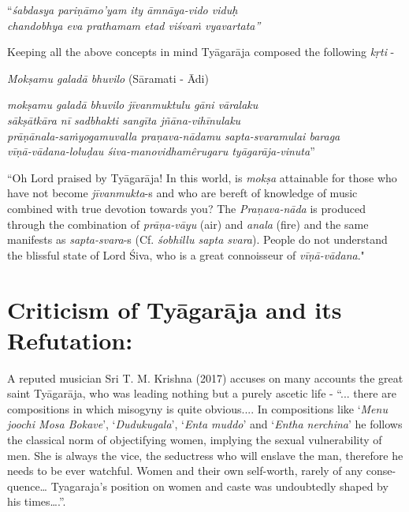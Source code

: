 \begin{longquote}
“\textit{śabdasya pariṇāmo’yam ity āmnāya-vido viduḥ }\\ \textit{chandobhya eva prathamam etad viśvaṁ vyavartata”} 
\end{longquote}

Keeping all the above concepts in mind Tyāgarāja composed the following \textit{kṛti} -

\textit{Mokṣamu galadā bhuvilo} (Sāramati - Ādi)

\begin{longquote}
\textit{mokṣamu galadā bhuvilo jīvanmuktulu gāni vāralaku}\\ \textit{sākṣātkāra nī sadbhakti sangīta jñāna-vihīnulaku}\\ \textit{prāṇānala-saṁyogamuvalla praṇava-nādamu sapta-svaramulai baraga}\\ \textit{vīṇā-vādana-loluḍau śiva-manovidhamêrugaru tyāgarāja-vinuta}”
\end{longquote}

``Oh Lord praised by Tyāgarāja! In this world, is \textit{mokṣa} attainable for those who have not become \textit{jīvanmukta}-s and who are bereft of knowledge of music combined with true devotion towards you? The \textit{Praṇava-nāda} is produced through the combination of \textit{prāṇa-vāyu} (air) and \textit{anala} (fire) and the same manifests as \textit{sapta-svara}-s (Cf. \textit{śobhillu sapta svara}). People do not understand the blissful state of Lord Śiva, who is a great connoisseur of \textit{vīṇā-vādana}."

\vspace{-.3cm}

\section*{Criticism of Tyāgarāja and its Refutation:}

\vspace{-.2cm}

A reputed musician Sri T. M. Krishna (2017) accuses on many accounts the great saint Tyāgarāja, who was leading nothing but a purely ascetic life - “... there are compositions in which misogyny is quite obvious.... In compositions like ‘\textit{Menu joochi Mosa Bokave}’, ‘\textit{Dudukugala}’, ‘\textit{Enta muddo}’ and ‘\textit{Entha nerchina}’ he follows the classical norm of objectifying women, implying the sexual vulnerability of men. She is always the vice, the seductress who will enslave the man, therefore he needs to be ever watchful. Women and their own self-worth, rarely of any conse-\break\newpage quence… Tyagaraja’s position on women and caste was undoubtedly shaped by his times….”.

